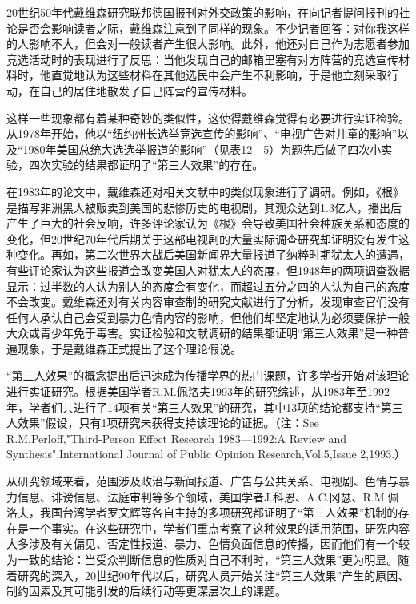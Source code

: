 \documentclass[UTF8,12pt]{ctexart}
\numberwithin{equation}{section} %
\numberwithin{figure}{section}
\numberwithin{table}{section}
\begin{document}
	20世纪50年代戴维森研究联邦德国报刊对外交政策的影响，在向记者提问报刊的社论是否会影响读者之际，戴维森注意到了同样的现象。不少记者回答：对你我这样的人影响不大，但会对一般读者产生很大影响。此外，他还对自己作为志愿者参加竞选活动时的表现进行了反思：当他发现自己的邮箱里塞有对方阵营的竞选宣传材料时，他直觉地认为这些材料在其他选民中会产生不利影响，于是他立刻采取行动，在自己的居住地散发了自己阵营的宣传材料。
	
	这样一些现象都有着某种奇妙的类似性，这使得戴维森觉得有必要进行实证检验。从1978年开始，他以“纽约州长选举竞选宣传的影响”、“电视广告对儿童的影响”以及“1980年美国总统大选选举报道的影响”（见表12—5）为题先后做了四次小实验，四次实验的结果都证明了“第三人效果”的存在。
	
	在1983年的论文中，戴维森还对相关文献中的类似现象进行了调研。例如，《根》是描写非洲黑人被贩卖到美国的悲惨历史的电视剧，其观众达到1.3亿人，播出后产生了巨大的社会反响，许多评论家认为《根》会导致美国社会种族关系和态度的变化，但20世纪70年代后期关于这部电视剧的大量实际调查研究却证明没有发生这种变化。再如，第二次世界大战后美国新闻界大量报道了纳粹时期犹太人的遭遇，有些评论家认为这些报道会改变美国人对犹太人的态度，但1948年的两项调查数据显示：过半数的人认为别人的态度会有变化，而超过五分之四的人认为自己的态度不会改变。戴维森还对有关内容审查制的研究文献进行了分析，发现审查官们没有任何人承认自己会受到暴力色情内容的影响，但他们却坚定地认为必须要保护一般大众或青少年免于毒害。实证检验和文献调研的结果都证明“第三人效果”是一种普遍现象，于是戴维森正式提出了这个理论假说。
	
	“第三人效果”的概念提出后迅速成为传播学界的热门课题，许多学者开始对该理论进行实证研究。根据美国学者R.M.佩洛夫1993年的研究综述，从1983年至1992年，学者们共进行了14项有关“第三人效果”的研究，其中13项的结论都支持“第三人效果”假设，只有1项研究未获得支持该理论的证据。（注：See R.M.Perloff,"Third-Person Effect Research 1983—1992:A Review and Synthesis",International Journal of Public Opinion Research,Vol.5,Issue 2,1993.）
	
	从研究领域来看，范围涉及政治与新闻报道、广告与公共关系、电视剧、色情与暴力信息、诽谤信息、法庭审判等多个领域，美国学者J.科恩、A.C.冈瑟、R.M.佩洛夫，我国台湾学者罗文辉等各自主持的多项研究都证明了“第三人效果”机制的存在是一个事实。在这些研究中，学者们重点考察了这种效果的适用范围，研究内容大多涉及有关偏见、否定性报道、暴力、色情负面信息的传播，因而他们有一个较为一致的结论：当受众判断信息的性质对自己不利时，“第三人效果”更为明显。随着研究的深入，20世纪90年代以后，研究人员开始关注“第三人效果”产生的原因、制约因素及其可能引发的后续行动等更深层次上的课题。
	
\end{document}
